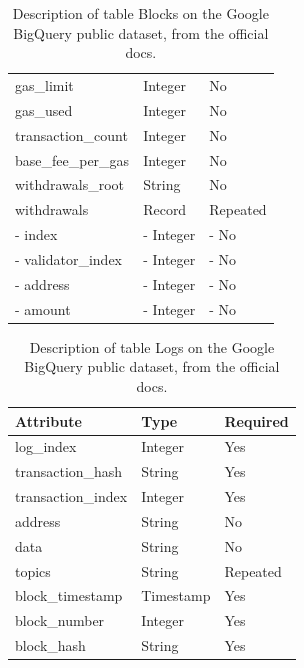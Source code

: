 \begin{table}[H]
\begin{tabular}  { m{6cm} m{3cm} m{3cm} }
    gas\_limit & Integer & No\\ %
    gas\_used & Integer & No\\ %
    transaction\_count & Integer & No\\ %
    base\_fee\_per\_gas & Integer & No\\ %
    withdrawals\_root & String & No\\ %
    withdrawals & Record & Repeated\\ %
    \quad- index & \quad- Integer & \quad- No\\ %
    \quad- validator\_index & \quad- Integer & \quad- No\\ %
    \quad- address & \quad- Integer & \quad- No\\ %
    \quad- amount & \quad- Integer & \quad- No\\ %
    \bottomrule
\end{tabular}
\caption[Google BigQuery \texttt{Blocks} table]{Description of table Blocks on the Google BigQuery public dataset, from the official docs.}
\label{table:bigquery-blocks}
\end{table}

\begin{table}[H]
\centering
    \begin{tabular}  { m{6cm} m{3cm} m{3cm} } 
    \toprule
    \textbf{Attribute} & \textbf{Type} & \textbf{Required} \\
    \midrule
    log\_index & Integer	& Yes \\
    transaction\_hash & String & Yes \\
    transaction\_index & Integer & Yes	\\		
    address & String & No \\
    data & String & No \\
    topics & String & Repeated \\
    block\_timestamp & Timestamp & Yes \\ 
    block\_number & Integer & Yes \\
    block\_hash & String & Yes \\
    \bottomrule
\end{tabular}
\caption[Google BigQuery \texttt{Logs} table]{Description of table Logs on the Google BigQuery public dataset, from the official docs.}
\label{table:bigquery-logs}
\end{table}

